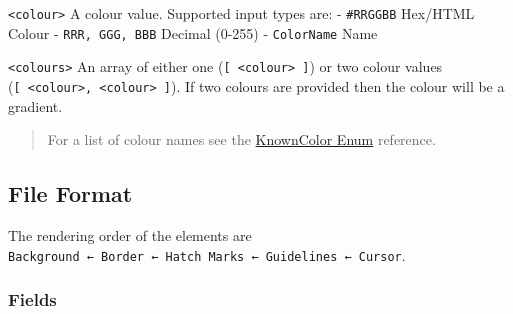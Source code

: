 \documentclass[
]{book}
\begin{document}
\texttt{\textless{}colour\textgreater{}} A colour value.
Supported input types are:
- \texttt{\textquotesingle{}\#RRGGBB\textquotesingle{}} Hex/HTML Colour
- \texttt{RRR,\ GGG,\ BBB} Decimal (0-255)
- \texttt{ColorName} Name

\texttt{\textless{}colours\textgreater{}} An array of either one (\texttt{{[}\ \textless{}colour\textgreater{}\ {]}}) or two colour values (\texttt{{[}\ \textless{}colour\textgreater{},\ \textless{}colour\textgreater{}\ {]}}).
If two colours are provided then the colour will be a gradient.

\begin{quote}
For a list of colour names see the \href{https://docs.microsoft.com/en-us/dotnet/api/system.drawing.knowncolor?view=netcore-3.1}{KnownColor Enum} reference.
\end{quote}

\subsection{File Format}\label{file-format}

The rendering order of the elements are \texttt{Background\ ←\ Border\ ←\ Hatch\ Marks\ ←\ Guidelines\ ←\ Cursor}.

\subsubsection{Fields}\label{fields}
\end{document}
